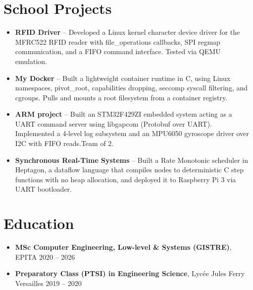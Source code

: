 \documentclass[9pt,a4paper]{article}
\begin{document}
\section*{School Projects}
\begin{tcolorbox}[mybox]
\begin{itemize}
\item \textbf{RFID Driver} -- Developed a Linux kernel character device driver for the MFRC522 RFID reader with file\_operations callbacks, SPI regmap communication, and a FIFO command interface. Tested via QEMU emulation.

\item \textbf{My Docker} -- Built a lightweight container runtime in C, using Linux namespaces, pivot\_root, capabilities dropping, seccomp syscall filtering, and cgroups. Pulls and mounts a root filesystem from a container registry.

\item \textbf{ARM project} -- Built an STM32F429ZI embedded system acting as a UART command server using libgapcom (Protobuf over UART). Implemented a 4-level log subsystem and an MPU6050 gyroscope driver over I2C with FIFO reads.Team of 2.

\item \textbf{Synchronous Real-Time Systems} -- Built a Rate Monotonic scheduler in Heptagon, a dataflow language that compiles nodes to deterministic C step functions with no heap allocation, and deployed it to Raspberry Pi 3 via UART bootloader.
\end{itemize}
\end{tcolorbox}


\section*{Education}
\begin{tcolorbox}[mybox]
\begin{itemize}
\item \textbf{MSc Computer Engineering, Low-level \& Systems (GISTRE)}, EPITA {\small{\hfill 2020 – 2026}}

\item \textbf{Preparatory Class (PTSI) in Engineering Science}, Lycée Jules Ferry Versailles {\small{\hfill 2019 – 2020}}
\end{itemize}
\end{tcolorbox}
\end{document}

